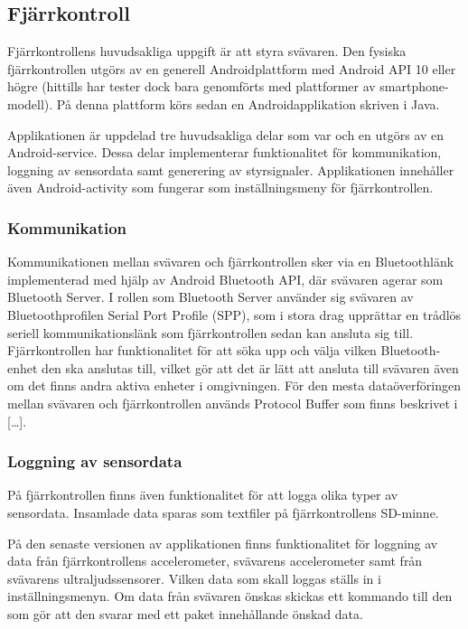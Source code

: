 \subsection{Fjärrkontroll}
Fjärrkontrollens huvudsakliga uppgift är att styra svävaren. Den fysiska fjärrkontrollen utgörs av en generell Androidplattform med Android API 10 eller högre (hittills har tester dock bara genomförts med plattformer av smartphone-modell). På denna plattform körs sedan en Androidapplikation skriven i Java. 

Applikationen är uppdelad tre huvudsakliga delar som var och en utgörs av en Android-service. Dessa delar implementerar funktionalitet för kommunikation, loggning av sensordata samt generering av styrsignaler. Applikationen innehåller även Android-activity som fungerar som inställningsmeny för fjärrkontrollen.

\subsubsection{Kommunikation}
Kommunikationen mellan svävaren och fjärrkontrollen sker via en Bluetoothlänk
implementerad med hjälp av Android Bluetooth API, där svävaren agerar som
Bluetooth Server. I rollen som Bluetooth Server använder sig svävaren av
Bluetoothprofilen Serial Port Profile (SPP), som i stora drag upprättar en
trådlös seriell kommunikationslänk som fjärrkontrollen sedan kan ansluta sig
till.
Fjärrkontrollen har funktionalitet för att söka upp och välja vilken Bluetooth-enhet den ska anslutas till, vilket gör att det är lätt att ansluta till svävaren även om det finns andra aktiva enheter i omgivningen.
För den mesta dataöverföringen mellan svävaren och fjärrkontrollen används Protocol Buffer som finns beskrivet i […].

\subsubsection{Loggning av sensordata}
På fjärrkontrollen finns även funktionalitet för att logga olika typer av sensordata. Insamlade data sparas som textfiler på fjärrkontrollens SD-minne. 

På den senaste versionen av applikationen finns funktionalitet för loggning av data från fjärrkontrollens accelerometer, svävarens accelerometer samt från svävarens ultraljudssensorer. Vilken data som skall loggas ställs in i inställningsmenyn. Om data från svävaren önskas skickas ett kommando till den som gör att den svarar med ett paket innehållande önskad data. 

